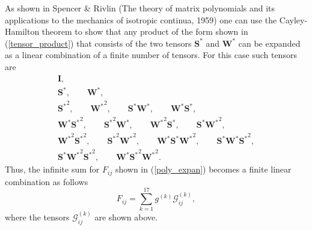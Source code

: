 \documentclass[oneside,a4paper,11pt]{report}
\newcommand{\Stau}{S^*}
\newcommand{\Wtau}{W^*}
\begin{document}
As shown in Spencer \& Rivlin (The theory of matrix polynomials and its applications to the mechanics of isotropic continua, 1959) one can use the Cayley-Hamilton theorem to show that any product of the form shown in (\ref{tensor_product}) that consists of  the two tensors $\mathbf{\Stau}$ and $\mathbf{\Wtau}$ can be expanded as a linear combination of a finite number of tensors. For this case such tensors are
\begin{gather}
\mathbf{I}, \nonumber \\
\mathbf{\Stau}, \qquad \mathbf{\Wtau}, \nonumber \\
\mathbf{\Stau}^2, \qquad \mathbf{\Wtau}^2, \qquad \mathbf{\Stau} \mathbf{\Wtau}, \qquad \mathbf{\Wtau} \mathbf{\Stau}, \nonumber \\
\mathbf{\Wtau} \mathbf{\Stau}^2, \qquad \mathbf{\Stau}^2 \mathbf{\Wtau}, \qquad \mathbf{\Wtau}^2 \mathbf{\Stau}, \qquad \mathbf{\Stau} \mathbf{\Wtau}^2, \nonumber \\
\mathbf{\Wtau}^2 \mathbf{\Stau}^2, \qquad \mathbf{\Stau}^2 \mathbf{\Wtau}^2, \qquad \mathbf{\Wtau} \mathbf{\Stau} \mathbf{\Wtau}^2, \qquad \mathbf{\Stau} \mathbf{\Wtau} \mathbf{\Stau}^2, \nonumber \\
\mathbf{\Stau} \mathbf{\Wtau}^2 \mathbf{\Stau}^2, \qquad \mathbf{\Wtau} \mathbf{\Stau}^2 \mathbf{\Wtau}^2.
\end{gather}
Thus, the infinite sum for $F_{ij}$ shown in (\ref{poly_expan}) becomes a finite linear combination as follows
\begin{equation}
\label{rs_algebraic_model}
F_{ij} = \sum_{k = 1}^{17} g^{(k)}\mathcal{G}_{ij}^{(k)},
\end{equation}
where the tensors $\mathcal{G}_{ij}^{(k)}$ are shown above.
\end{document}
